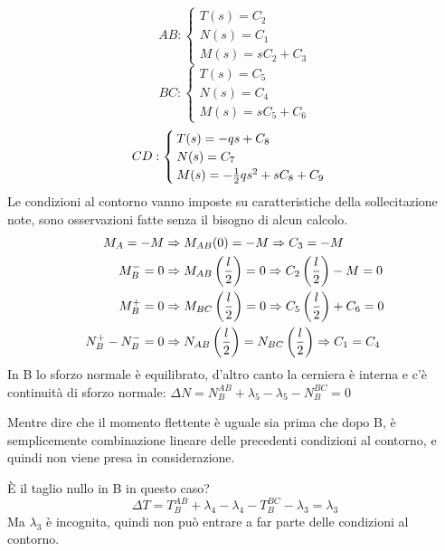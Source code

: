 \documentclass{article}
\begin{document}
\begin{adjustwidth}{2in}{}
	\[
	AB:	
	\begin{cases}
		T(s) = C_2 \\
		
		N(s) = C_1 \\
		
		M(s) =  sC_2 + C_3
	\end{cases}
	\] 
	\[
	BC: \begin{cases}
		T(s) = C_5 \\
		
		N(s) = C_4 \\
		
		M(s) =  sC_5 + C_6
	\end{cases}
	\]
	\[
	CD: \begin{cases}
		T(s) = -qs+C_8 \\
		
		N(s) = C_7 \\
		
		M(s) =  -{1\over2}qs^2 + sC_8 + C_9
	\end{cases}
	\]
	Le condizioni al contorno vanno imposte su caratteristiche della sollecitazione note, sono osservazioni fatte senza il bisogno di alcun calcolo. 
	\[
	\begin{split}
		M_A= -M & \Rightarrow M_{AB} (0)= -M \Rightarrow C_3 = -M \\
		M^-_B= 0 & \Rightarrow M_{AB} \left(l\over2\right)= 0 \Rightarrow C_2\left(l\over2\right)-M = 0 \\
		M^+_B= 0 & \Rightarrow M_{BC} \left(l\over2\right)= 0 \Rightarrow C_5\left(l\over2\right)+C_6 = 0 \\
		N^+_B-N^-_B = 0 & \Rightarrow N_{AB}\left(l\over2\right) = N_{BC}\left(l\over2\right) \Rightarrow C_1 = C_4 \\
	\end{split} \]
	In B lo sforzo normale è equilibrato, d'altro canto la cerniera è interna e c'è continuità di sforzo normale: \(\Delta N = N_B^{AB} + \lambda_5-\lambda_5 - N_B^{BC} = 0\) \newline
	
	Mentre dire che il momento flettente è uguale sia prima che dopo B, è semplicemente combinazione lineare delle precedenti condizioni al contorno, e quindi non viene presa in considerazione. \newline
	
	È il taglio nullo in B in questo caso? 
	\[\Delta T = T_B^{AB} + \lambda_4 - \lambda_4 -T_B^{BC}-\lambda_3 = \lambda_3\]
	Ma $\lambda_3$ è incognita, quindi non può entrare a far parte delle condizioni al contorno. 
	

\end{adjustwidth}
\end{document}
